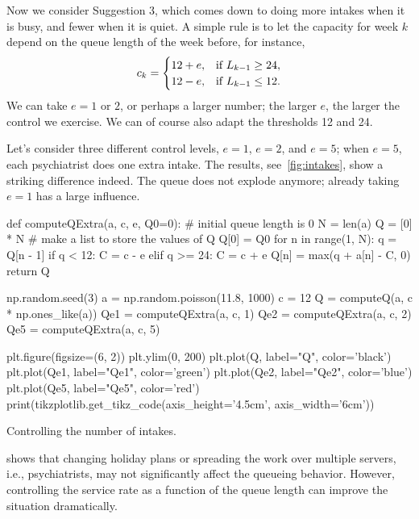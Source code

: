 Now we consider Suggestion 3, which comes down to doing more intakes when it is busy, and fewer when it is quiet.
A simple rule is to let the capacity  for week $k$ depend on the queue length of the week before, for instance,
\begin{equation}\label{eq:103}
  c_k =
  \begin{cases}
    12 + e, & \text{if } L_{k-1} \geq 24, \\
    12 - e, & \text{if } L_{k-1} \leq 12.
  \end{cases}
\end{equation}
We can take  $e=1$ or $2$, or perhaps a larger number; the larger $e$, the larger the control we exercise. We can of course also adapt the thresholds 12 and 24.

Let's consider three different control levels, $e=1$, $e=2$, and $e=5$; when $e=5$, each psychiatrist does one extra intake.
The results, see~\cref{fig:intakes}, show a striking difference indeed.
The queue does not explode anymore;  already taking $e=1$ has a large influence.

\begin{marginfigure}
\begin{pycode}[simulation]
def computeQExtra(a, c, e, Q0=0):  #  initial queue length is 0
    N = len(a)
    Q = [0] * N  # make a list to store the values of  Q
    Q[0] = Q0
    for n in range(1, N):
        q = Q[n - 1]
        if q < 12:
            C = c - e
        elif q >= 24:
            C = c + e
        Q[n] = max(q + a[n] - C, 0)
    return Q


np.random.seed(3)
a = np.random.poisson(11.8, 1000)
c = 12
Q = computeQ(a, c * np.ones_like(a))
Qe1 = computeQExtra(a, c, 1)
Qe2 = computeQExtra(a, c, 2)
Qe5 = computeQExtra(a, c, 5)

plt.figure(figsize=(6, 2))
plt.ylim(0, 200)
plt.plot(Q, label="Q", color='black')
plt.plot(Qe1, label="Qe1", color='green')
plt.plot(Qe2, label="Qe2", color='blue')
plt.plot(Qe5, label="Qe5", color='red')
print(tikzplotlib.get_tikz_code(axis_height='4.5cm', axis_width='6cm'))
\end{pycode}
\caption{Controlling the number of intakes. }
\label{fig:intakes}
\end{marginfigure}


 shows that changing holiday plans or spreading the work over multiple servers, i.e., psychiatrists, may not significantly affect the queueing behavior.
However, controlling the service rate as a function of the queue length can improve the situation dramatically.



